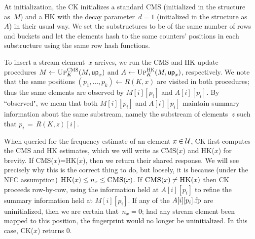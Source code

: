 At initialization, the CK initializes a standard CMS (initialized in the structure as~$M$) and a HK with the decay parameter~$d=1$ (initialized in the structure as~$A$) in their usual way. We set the substructures to be of the same number of rows and buckets and let the elements hash to the same counters' positions in each substructure using the same row hash functions. 

To insert a stream element~$x$ arrives, we run the CMS and HK update procedures $M\gets\textnormal{\textsc{Up}}^{\textnormal{\textsc{CMS}}}_{K}(M,\mathsf{up}_x)$ and $A\gets\textnormal{\textsc{Up}}^{\textnormal{\textsc{HK}}}_{K}(M,\mathsf{up}_x)$, respectively.  We note that the same positions $(p_1,\ldots,p_k) \gets R(K,x)$ are visited in both procedures; thus the same elements are observed by $M[i][p_i]$ and $A[i][p_i]$.  By ``observed", we mean that both $M[i][p_i]$ and $A[i][p_i]$ maintain summary information about the same substream, namely the substream of elements~$z$ such that $p_i\,{=}\,R(K,z)[i]$.




When queried for the frequency estimate of an element $x\in \mathcal{U}$, CK first computes the CMS and HK estimates, which we will write as CMS($x$) and HK($x$) for brevity. If CMS($x$)=HK($x$), then we return their shared response.  We will see precisely why this is the correct thing to do, but loosely, it is because (under the NFC assumption) $\textnormal{\textsc{HK}}(x) \leq n_x \leq \textnormal{\textsc{CMS}}(x)$.  If $\textnormal{\textsc{CMS}}(x) \neq \textnormal{\textsc{HK}}(x)$ then CK proceeds row-by-row, using the information held at $A[i][p_i]$ to refine the summary information held at $M[i][p_i]$.  
If any of the $A[i][p_i].\textup{fp}$ are uninitialized, then we are certain that~$n_x=0$; had any stream element been mapped to this position, the fingerprint would no longer be uninitialized.
In this case, CK($x$) returns 0.



